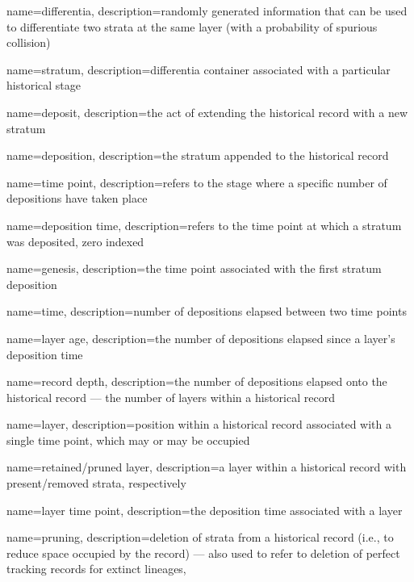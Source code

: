 
\makeglossaries

{
    name=differentia,
    description={randomly generated information that can be used to differentiate two strata at the same layer (with a probability of spurious collision)}
}

{
    name=stratum,
    description={differentia container associated with a particular historical stage}
}

{
    name=deposit,
    description={the act of extending the historical record with a new stratum}
}

{
    name=deposition,
    description={the stratum appended to the historical record}
}

{
    name=time point,
    description={refers to the stage where a specific number of depositions have taken place}
}

{
    name=deposition time,
    description={refers to the time point at which a stratum was deposited, zero indexed}
}

{
    name=genesis,
    description={the time point associated with the first stratum deposition}
}

{
    name=time,
    description={number of depositions elapsed between two time points}
}

{
    name=layer age,
    description={the number of depositions elapsed since a layer's deposition time}
}

{
    name=record depth,
    description={the number of depositions elapsed onto the historical record --- the number of layers within a historical record}
}

{
    name=layer,
    description={position within a historical record associated with a single time point, which may or may be occupied}
}

{
    name=retained/pruned layer,
    description={a layer within a historical record with present/removed strata, respectively}
}

{
    name=layer time point,
    description={the deposition time associated with a layer}
}

{
    name=pruning,
    description={deletion of strata from a historical record (i.e., to reduce space occupied by the record) --- also used to refer to deletion of perfect tracking records for extinct lineages,}
}

